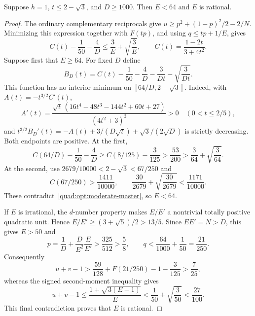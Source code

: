 \begin{lemma}\label{quad:opt:moderate-ratio}
Suppose $h=1$, $t\le2-\sqrt3$, and $D\ge1000$.
Then $E<64$ and $E$ is rational.
\end{lemma}
\begin{proof}
The ordinary complementary reciprocals give
$u\ge p^2+(1-p)^2/2-2/N$. Minimizing this expression together with
$F(tp)$, and using $q\le tp+1/E$, gives
\begin{equation}\label{quad:opt:moderate-master}
 C(t)-\frac1{50}-\frac4D\le\frac3E+\sqrt{\frac3E},
 \qquad C(t)=\frac{1-2t}{3+4t^2}.
\end{equation}
Suppose first that $E\ge64$. For fixed $D$ define
\[
 B_D(t)=C(t)-\frac1{50}-\frac4D-\frac3{Dt}-\sqrt{\frac3{Dt}}.
\]
This function has no interior minimum on $[64/D,2-\sqrt3]$.
Indeed, with $A(t)=-t^{3/2}C'(t)$,
\[
 A'(t)=\frac{\sqrt t\,(16t^4-48t^3-144t^2+60t+27)}{(4t^2+3)^3}>0
 \quad(0<t\le2/5),
\]
and
$t^{3/2}B_D'(t)=-A(t)+3/(D\sqrt t)+\sqrt3/(2\sqrt D)$
is strictly decreasing. Both endpoints are positive. At the first,
\[
 C(64/D)-\frac1{50}-\frac4D
 \ge C(8/125)-\frac3{125}>\frac{53}{200}
 >\frac3{64}+\sqrt{\frac3{64}}.
\]
At the second, use
$2679/10000<2-\sqrt3<67/250$ and
\[
 C(67/250)>\frac{1411}{10000},\qquad
 \frac{30}{2679}+\sqrt{\frac{30}{2679}}<\frac{1171}{10000}.
\]
These contradict~\eqref{quad:opt:moderate-master}, so $E<64$.

If $E$ is irrational, the $d$-number property makes $E/E'$ a
nontrivial totally positive quadratic unit. Hence
$E/E'\ge(3+\sqrt5)/2>13/5$. Since $EE'=N>D$, this gives $E>50$ and
\[
 p=\frac1D+\frac D{E^2}\frac E{E'}>\frac{325}{512}>\frac58,
 \qquad q<\frac{64}{1000}+\frac1{50}=\frac{21}{250}.
\]
Consequently
\[
 u+v-1>
 \frac{59}{128}+F(21/250)-1-\frac3{125}>\frac7{25},
\]
whereas the signed second-moment inequality gives
\[
 u+v-1\le\frac{1+\sqrt{3(E-1)}}E
 <\frac1{50}+\sqrt{\frac3{50}}<\frac{27}{100}.
\]
This final contradiction proves that $E$ is rational.
\end{proof}

